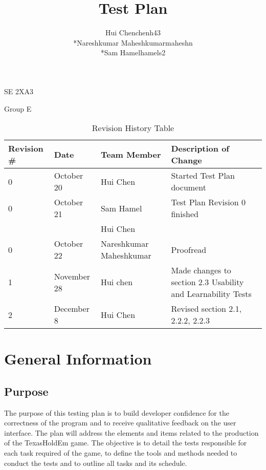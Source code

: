 \documentclass[12pt]{article}
\begin{document}
	\begin{titlepage}
	\title {Test Plan}
	\maketitle
		\begin{center}
		SE 2XA3\\
		\author{
		Hui Chen\hspace{128pt}chenh43	
		\\*Nareshkumar Maheshkumar\hspace{35pt}maheshn 
		\\*Sam Hamel\hspace{118pt}hamels2 \\
		}

		Group E
		\end{center}
	\end{titlepage}
	
	\newpage
	\tableofcontents
	\listoftables
	
	\newpage
	\begin{table}[h]
	\caption{Revision History Table}
	\begin{tabular}{|p{1.5cm}|l|p{3cm}|p{6cm}|}
  	\hline
  	Revision \# & Date & Team Member & Description of Change\\
  	\hline
  	0 & October 20 & Hui Chen & Started Test Plan document\\
  	\hline
  	0 & October 21 & Sam Hamel  & Test Plan Revision 0 finished\\
  	 & & Hui Chen & \\
  	\hline
  	0 & October 22 & Nareshkumar Maheshkumar & Proofread\\
  	\hline
  	1 & November 28 & Hui chen & Made changes to section 2.3 Usability and Learnability Tests\\
  	\hline
  	2 & December 8 & Hui Chen & Revised section 2.1, 2.2.2, 2.2.3\\
  	\hline
	\end{tabular}
	\end{table}
	\newpage
	
	\section{General Information}
	\subsection{Purpose}    
	The purpose of this testing plan is to build developer confidence for the correctness of the program and to receive qualitative feedback on the user interface. The plan will address the elements and items related to the production of the TexasHoldEm game. The objective is to detail the tests responsible for each task required of the game, to define the tools and methods needed to conduct the tests and to outline all tasks and its schedule. 
\end{document}
